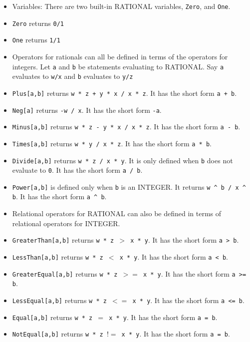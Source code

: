\begin{itemize}
\item
Variables:  
There are two built-in RATIONAL variables, \verb+Zero+, and \verb+One+.

\bd
\item
\verb+Zero+ returns \verb+0/1+

\item
\verb+One+ returns \verb+1/1+
\ed

\item
Operators for rationals can all be defined in terms of the operators
for integers.  Let \verb+a+ and \verb+b+ be statements evaluating to
RATIONAL. Say \verb+a+ evaluates to \verb+w/x+ and \verb+b+ evaluates
to \verb+y/z+

\bd
\item
\verb+Plus[a,b]+ returns \verb&w * z + y * x / x * z&. It has the
short form \verb&a + b&.  
 
\item
\verb+Neg[a]+ returns \verb+-w / x+.  It has the short form \verb&-a&.  
 
\item
\verb+Minus[a,b]+ returns \verb+w * z - y * x / x * z+.  
It has the short form \verb&a - b&.  

\item
\verb+Times[a,b]+ returns \verb+w * y / x * z+.  It has the short form 
\verb+a * b+.

\item
\verb+Divide[a,b]+ returns \verb+w * z / x * y+. It is only defined
when \verb+b+ does not evaluate to \verb+0+.  It has the
short form \verb+a / b+.
\item 
\verb+Power[a,b]+ is defined only when \verb+b+ is an INTEGER.  It 
returns \verb+w ^ b / x ^ b+.  It has the short form \verb+a ^ b+.

\ed
\item
Relational operators for RATIONAL can also be defined in terms of
relational operators for INTEGER.  
\bd
\item
\verb+GreaterThan[a,b]+ returns \verb+w * z +$>$\verb+ x * y+.
It has the short form \verb+a > b+.

\item
\verb+LessThan[a,b]+ returns \verb+w * z +$<$\verb+ x * y+.
It has the short form \verb+a < b+.

\item
\verb+GreaterEqual[a,b]+ returns \verb+w * z +$>=$\verb+ x * y+.
It has the short form \verb+a >= b+.

\item
\verb+LessEqual[a,b]+ returns \verb+w * z +$<=$\verb+ x * y+.
It has the short form \verb+a <= b+.

\item
\verb+Equal[a,b]+ returns \verb+w * z +$=$\verb+ x * y+.
It has the short form \verb+a = b+.

\item
\verb+NotEqual[a,b]+ returns \verb+w * z +$!=$\verb+ x * y+.
It has the short form \verb+a = b+.
\ed
\end{itemize}


